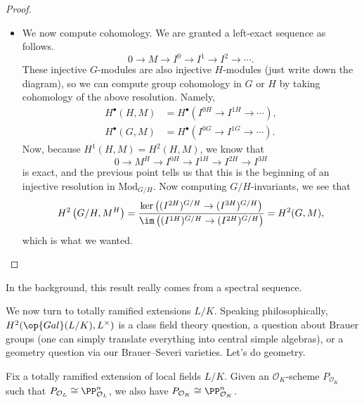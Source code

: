 \documentclass[../notes.tex]{subfiles}
\begin{document}
\begin{proof}
\begin{itemize}
		\item We now compute cohomology. We are granted a left-exact sequence as follows.
		\[0\to M\to I^0\to I^1\to I^2\to\cdots.\]
		These injective $G$-modules are also injective $H$-modules (just write down the diagram), so we can compute group cohomology in $G$ or $H$ by taking cohomology of the above resolution. Namely,
		\begin{align*}
			H^\bullet(H,M) &= H^\bullet\left(I^{0H}\to I^{1H}\to\cdots\right), 
			\\
			H^\bullet(G,M) &= H^\bullet\left(I^{0G}\to I^{1G}\to\cdots\right).
		\end{align*}
		Now, because $H^1(H,M)=H^2(H,M)$, we know that
		\[0\to M^H\to I^{0H}\to I^{1H}\to I^{2H}\to I^{3H}\]
		is exact, and the previous point tells us that this is the beginning of an injective resolution in $\mathrm{Mod}_{G/H}$. Now computing $G/H$-invariants, we see that
		\[H^2\left(G/H,M^H\right)=\frac{\ker\left((I^{2H})^{G/H}\to (I^{3H})^{G/H}\right)}{\im\left((I^{1H})^{G/H}\to (I^{2H})^{G/H}\right)}=H^2(G,M),\]
		which is what we wanted.
		\qedhere
	\end{itemize}
\end{proof}
\begin{remark}
	In the background, this result really comes from a spectral sequence.
\end{remark}
We now turn to totally ramified extensions $L/K$. Speaking philosophically, $H^2(\op{Gal}(L/K),L^\times)$ is a class field theory question, a question about Brauer groups (one can simply translate everything into central simple algebras), or a geometry question via our Brauer--Severi varieties. Let's do geometry.
\begin{lemma} \label{lem:br-severi-thing}
	Fix a totally ramified extension of local fields $L/K$. Given an $\mathcal O_K$-scheme $P_{\mathcal O_K}$ such that $P_{\mathcal O_L}\cong\PP^n_{\mathcal O_L}$, we also have $P_{\mathcal O_K}\cong\PP^n_{\mathcal O_K}$.
\end{lemma}
\end{document}
